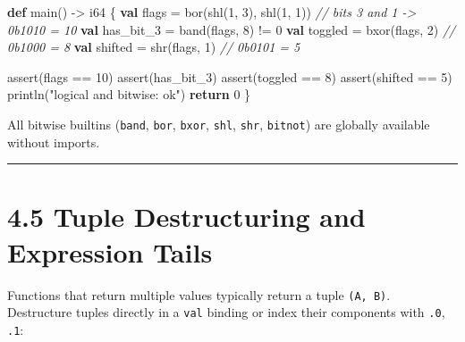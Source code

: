 \documentclass[
  english,
  oneside]{book}
\newenvironment{Shaded}{\begin{snugshade}}{\end{snugshade}}
\newcommand{\CommentTok}[1]{\textcolor[rgb]{0.42,0.60,0.33}{\textit{#1}}}
\newcommand{\ControlFlowTok}[1]{\textcolor[rgb]{0.77,0.53,0.75}{\textbf{#1}}}
\newcommand{\DataTypeTok}[1]{\textcolor[rgb]{0.31,0.79,0.69}{#1}}
\newcommand{\DecValTok}[1]{\textcolor[rgb]{0.71,0.81,0.66}{#1}}
\newcommand{\FunctionTok}[1]{\textcolor[rgb]{0.86,0.86,0.67}{#1}}
\newcommand{\KeywordTok}[1]{\textcolor[rgb]{0.34,0.61,0.84}{\textbf{#1}}}
\newcommand{\NormalTok}[1]{\textcolor[rgb]{0.83,0.83,0.83}{#1}}
\newcommand{\OperatorTok}[1]{\textcolor[rgb]{0.83,0.83,0.83}{#1}}
\newcommand{\StringTok}[1]{\textcolor[rgb]{0.81,0.57,0.47}{#1}}
\begin{document}
\begin{Shaded}
\begin{Highlighting}[]
\KeywordTok{def}\NormalTok{ main() }\OperatorTok{{-}\textgreater{}} \DataTypeTok{i64}\NormalTok{ \{}
    \KeywordTok{val}\NormalTok{ flags }\OperatorTok{=} \FunctionTok{bor}\NormalTok{(}\FunctionTok{shl}\NormalTok{(}\DecValTok{1}\NormalTok{, }\DecValTok{3}\NormalTok{), }\FunctionTok{shl}\NormalTok{(}\DecValTok{1}\NormalTok{, }\DecValTok{1}\NormalTok{))   }\CommentTok{// bits 3 and 1 {-}\textgreater{} 0b1010 = 10}
    \KeywordTok{val}\NormalTok{ has\_bit\_3 }\OperatorTok{=} \FunctionTok{band}\NormalTok{(flags, }\DecValTok{8}\NormalTok{) }\OperatorTok{!=} \DecValTok{0}
    \KeywordTok{val}\NormalTok{ toggled }\OperatorTok{=} \FunctionTok{bxor}\NormalTok{(flags, }\DecValTok{2}\NormalTok{)            }\CommentTok{// 0b1000 = 8}
    \KeywordTok{val}\NormalTok{ shifted }\OperatorTok{=} \FunctionTok{shr}\NormalTok{(flags, }\DecValTok{1}\NormalTok{)             }\CommentTok{// 0b0101 = 5}

    \FunctionTok{assert}\NormalTok{(flags }\OperatorTok{==} \DecValTok{10}\NormalTok{)}
    \FunctionTok{assert}\NormalTok{(has\_bit\_3)}
    \FunctionTok{assert}\NormalTok{(toggled }\OperatorTok{==} \DecValTok{8}\NormalTok{)}
    \FunctionTok{assert}\NormalTok{(shifted }\OperatorTok{==} \DecValTok{5}\NormalTok{)}
\NormalTok{    println(}\StringTok{"logical and bitwise: ok"}\NormalTok{)}
    \ControlFlowTok{return} \DecValTok{0}
\NormalTok{\}}
\end{Highlighting}
\end{Shaded}

All bitwise builtins (\texttt{band}, \texttt{bor}, \texttt{bxor},
\texttt{shl}, \texttt{shr}, \texttt{bitnot}) are globally available
without imports.

\begin{center}\rule{0.5\linewidth}{0.5pt}\end{center}

\section{4.5 Tuple Destructuring and Expression
Tails}\label{tuple-destructuring-and-expression-tails}

Functions that return multiple values typically return a tuple
\texttt{(A,\ B)}. Destructure tuples directly in a \texttt{val} binding
or index their components with \texttt{.0}, \texttt{.1}:
\end{document}

